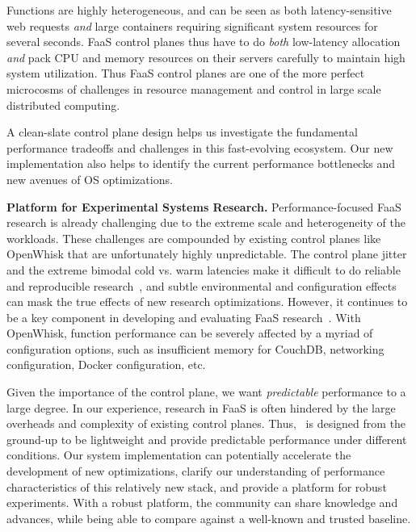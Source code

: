 Functions are highly heterogeneous, and can be seen as both latency-sensitive web requests \emph{and} large containers requiring significant system resources for several seconds. 
FaaS control planes thus have to do \emph{both} low-latency allocation \emph{and} pack CPU and memory resources on their servers carefully to maintain high system utilization.
%
Thus FaaS control planes are one of the more perfect microcosms of challenges in resource management and control in large scale distributed computing. 

A clean-slate control plane design helps us investigate the fundamental performance tradeoffs and challenges in this fast-evolving ecosystem.
Our new implementation also helps to identify the current performance bottlenecks and new avenues of OS optimizations. 


\noindent \textbf{Platform for Experimental Systems Research.}
%
Performance-focused FaaS research is already challenging due to the extreme scale and heterogeneity of the workloads.
These challenges are compounded by existing control planes like OpenWhisk that are unfortunately highly unpredictable.
The control plane jitter and the extreme bimodal cold vs. warm latencies make it difficult to do reliable and reproducible research~\cite{mytkowicz2009producing}, and subtle environmental and configuration effects can mask the true effects of new research optimizations.
However, it continues to be a key component in developing and evaluating FaaS research~\cite{akkus_sand_2018, shahrad_serverless_2020, faascache-asplos21, faaslb-hpdc22, zhou2022aquatope, ensure-faas-acsos20, alzayat_groundhog_2022}. 
With OpenWhisk, function performance can be severely affected by a myriad of configuration options, such as insufficient memory for CouchDB, networking configuration, Docker configuration, etc. 

Given the importance of the control plane, we want \emph{predictable} performance to a large degree. 
In our experience, research in FaaS is often hindered by the large overheads and complexity of existing control planes. 
Thus, \sysname~is designed from the ground-up to be lightweight and provide predictable performance under different conditions. 
Our system implementation can potentially accelerate the development of new optimizations, clarify  our understanding of performance characteristics of this relatively new stack, and provide a platform for robust experiments. 
With a robust platform, the community can share knowledge and advances, while being able to compare against a well-known and trusted baseline.
